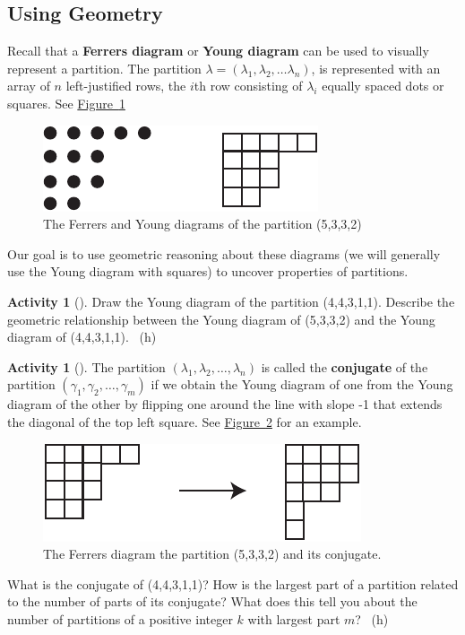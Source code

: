 \documentclass[10pt,]{book}
\newcommand{\terminology}[1]{\textbf{#1}}
\theoremstyle{plain}
\theoremstyle{definition}
\theoremstyle{definition}
\theoremstyle{definition}
\newtheorem{activity}[project]{Activity}
\numberwithin{equation}{chapter}
\begin{document}
\subsection[{Using Geometry}]{Using Geometry}\label{subsec_linearpartitionsgeom}
\hypertarget{p-1497}{}%
Recall that a \terminology{Ferrers diagram} or \terminology{Young diagram} can be used to visually represent a partition.  The partition \(\lambda = (\lambda_1,\lambda_2,\ldots \lambda_n)\), is represented with an array of \(n\) left-justified rows, the \(i\)th row consisting of \(\lambda_i\) equally spaced dots or squares.  See \hyperref[FerrersYoung-repeat]{Figure~\ref{FerrersYoung-repeat}}%
\begin{figure}
\centering
\includegraphics[width=0.45\linewidth]{images/FerrersYoung}
\caption{The Ferrers and Young diagrams of the partition (5,3,3,2)\label{FerrersYoung-repeat}}
\end{figure}
\hypertarget{p-1498}{}%
Our goal is to use geometric reasoning about these diagrams (we will generally use the Young diagram with squares) to uncover properties of partitions.%
\begin{activity}[]\label{activity-296}
\hypertarget{p-1499}{}%
Draw the Young diagram of the partition (4,4,3,1,1). Describe the geometric relationship between the Young diagram of (5,3,3,2) and the Young diagram of (4,4,3,1,1).%
~{\tiny (h)}\end{activity}
\begin{activity}[]\label{activity-297}
\hypertarget{p-1502}{}%
The partition \((\lambda_1,\lambda_2,\ldots, \lambda_n)\) is called the \terminology{conjugate} of the partition \((\gamma_1,\gamma_2,\ldots, \gamma_m)\) if we obtain the Young diagram of one from the Young diagram of the other by flipping one around the line with slope -1 that extends the diagonal of the top left square. See \hyperref[conjugateYoung]{Figure~\ref{conjugateYoung}} for an example.%
\begin{figure}
\centering
\includegraphics[width=0.5\linewidth]{images/conjugateYoung}
\caption{The Ferrers diagram the partition (5,3,3,2) and its conjugate.\label{conjugateYoung}}
\end{figure}
\hypertarget{p-1503}{}%
What is the conjugate of (4,4,3,1,1)? How is the largest part of a partition related to the number of parts of its conjugate? What does this tell you about the number of partitions of a positive integer \(k\) with largest part \(m\)?%
~{\tiny (h)}\end{activity}
\end{document}
